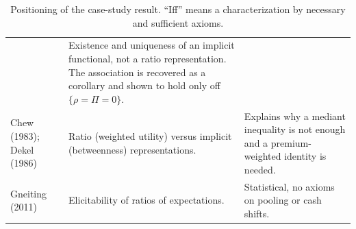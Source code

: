 \begin{table}[ht]
\begin{tabularx}{\textwidth}{@{}>{\raggedright\arraybackslash}p{3.1cm}>{\raggedright\arraybackslash}X>{\raggedright\arraybackslash}X@{}}
 & Existence and uniqueness of an implicit functional, not a ratio representation. The association is recovered as a corollary and shown to hold only off $\{\rho=\Pi=0\}$.\\
Chew (1983); Dekel (1986)
 & Ratio (weighted utility) versus implicit (betweenness) representations.
 & Explains why a mediant inequality is not enough and a premium-weighted identity is needed.\\
Gneiting (2011)
 & Elicitability of ratios of expectations.
 & Statistical, no axioms on pooling or cash shifts.\\
\bottomrule
\end{tabularx}
\caption{Positioning of the case-study result. ``Iff'' means a characterization by necessary and sufficient axioms.}\label{tab:littable}
\end{table}